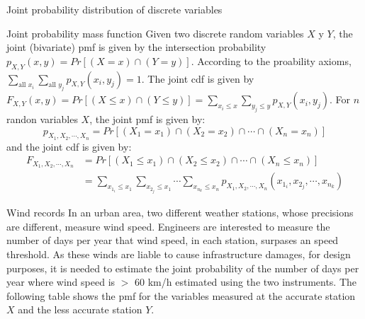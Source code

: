\documentclass[8pt]{beamer}
\renewcommand{\emph}[1]{\textcolor{myorange}{#1}}
\begin{document}
\begin{frame}{Joint probability distribution of discrete variables}
    \begin{block}{Joint probability mass function}
        Given two discrete random variables $X$ y $Y$, the joint (bivariate) \alert{pmf} is given by the intersection probability $p_{X,Y} (x,y) = Pr[(X=x) \cap (Y=y)]$. According to the proability axioms, $\sum_{\text{all } x_i} \sum_{\text{all } y_j} p_{X,Y} (x_i, y_j) = 1$. The joint \alert{cdf} is given by $ F_{X,Y} (x,y) = Pr[(X\leq x) \cap (Y\leq y)] =\sum_{x_i\leq x} \sum_{y_j\leq y} p_{X,Y} (x_i, y_j)  $.
        For $n$ randon variables $X$, the joint \emph{pmf} is given by:
        \[
            \displaystyle
            p_{X_1, X_2, \cdots, X_n} = Pr[(X_1 = x_1) \cap (X_2 = x_2) \cap \cdots \cap (X_n = x_n)]
        \]
        and the joint \emph{cdf} is given by:
        \begin{align*}
            \displaystyle
            F_{X_1, X_2, \cdots, X_n} &= Pr[(X_1 \leq x_1) \cap (X_2 \leq x_2) \cap \cdots \cap (X_n \leq x_n)] \\
                                      &= \sum_{x_{1_i}\leq x_1}  \sum_{x_{2_j}\leq x_1} \cdots \sum_{x_{n_k}\leq x_n} p_{X_1, X_2, \cdots, X_n} (x_{1_i}, x_{2_j}, \cdots, x_{n_k})
        \end{align*}
    \end{block}

    \begin{exampleblock}{Wind records}
        In an urban area, two different weather stations, whose precisions are different, measure wind speed. Engineers are interested to measure the number of days per year that wind speed,  in each station, surpases an speed threshold.  As these winds are liable to cause infrastructure damages, for design purposes, it is needed to estimate the joint probability of the number of days per year where wind speed is $>$ 60 km/h estimated using the two instruments. The following table shows the \emph{pmf} for the variables measured at the accurate station $X$ and the less accurate station $Y$. 
        
    \end{exampleblock}
\end{frame}
\end{document}
